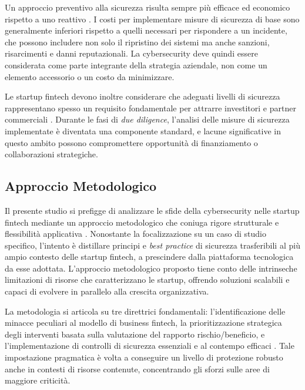 Un approccio preventivo alla sicurezza risulta sempre più efficace ed economico rispetto a uno reattivo \cite{fintechChallenges}. I costi per implementare misure di sicurezza di base sono generalmente inferiori rispetto a quelli necessari per rispondere a un incidente, che possono includere non solo il ripristino dei sistemi ma anche sanzioni, risarcimenti e danni reputazionali. La cybersecurity deve quindi essere considerata come parte integrante della strategia aziendale, non come un elemento accessorio o un costo da minimizzare.

Le startup fintech devono inoltre considerare che adeguati livelli di sicurezza rappresentano spesso un requisito fondamentale per attrarre investitori e partner commerciali \cite{fintechChallenges}. Durante le fasi di \textit{due diligence}, l'analisi delle misure di sicurezza implementate è diventata una componente standard, e lacune significative in questo ambito possono compromettere opportunità di finanziamento o collaborazioni strategiche.

\subsection{Approccio Metodologico}

Il presente studio si prefigge di analizzare le sfide della cybersecurity nelle startup fintech mediante un approccio metodologico che coniuga rigore strutturale e flessibilità applicativa \cite{fintechChallenges}. Nonostante la focalizzazione su un caso di studio specifico, l'intento è distillare principi e \textit{best practice} di sicurezza trasferibili al più ampio contesto delle startup fintech, a prescindere dalla piattaforma tecnologica da esse adottata. L'approccio metodologico proposto tiene conto delle intrinseche limitazioni di risorse che caratterizzano le startup, offrendo soluzioni scalabili e capaci di evolvere in parallelo alla crescita organizzativa.

La metodologia si articola su tre direttrici fondamentali: l'identificazione delle minacce peculiari al modello di business fintech, la prioritizzazione strategica degli interventi basata sulla valutazione del rapporto rischio/beneficio, e l'implementazione di controlli di sicurezza essenziali e al contempo efficaci \cite{fintechChallenges}. Tale impostazione pragmatica è volta a conseguire un livello di protezione robusto anche in contesti di risorse contenute, concentrando gli sforzi sulle aree di maggiore criticità.
